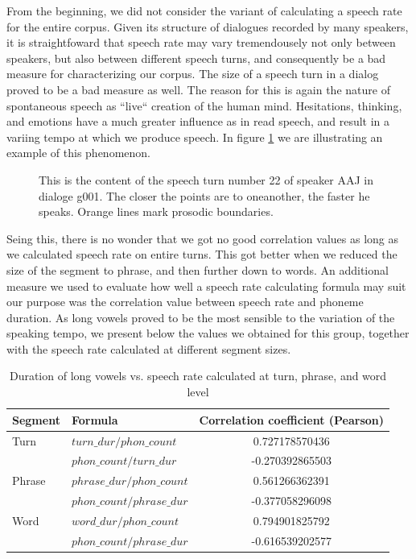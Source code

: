 \documentclass[a4paper]{scrreprt}
\begin{document}
From the beginning, we did not consider the variant of calculating a speech rate for the entire corpus. Given its structure of dialogues recorded by many speakers, it is straightfoward that speech rate may vary tremendousely not only between speakers, but also between different speech turns, and consequently be a bad measure for characterizing our corpus. The size of a speech turn in a dialog proved to be a bad measure as well. The reason for this is again the nature of spontaneous speech as ``live`` creation of the human mind. Hesitations, thinking, and emotions have a much greater influence as in read speech, and result in a variing tempo at which we produce speech. In figure \ref{fig:SR_example} we are illustrating an example of this phenomenon.

\begin{figure}[htbp]
	\centering
	\noindent{}
	\vspace{-25mm}
	\caption[Example of speech rate variation inside a turn]{This is the content of the speech turn number 22 of speaker AAJ in dialoge g001. The closer the points are to oneanother, the faster he speaks. Orange lines mark prosodic boundaries.}
	\label{fig:SR_example}
\end{figure}

Seing this, there is no wonder that we got no good correlation values as long as we calculated speech rate on entire turns. This got better when we reduced the size of the segment to phrase, and then further down to words. 
An additional measure we used to evaluate how well a speech rate calculating formula may suit our purpose was the correlation value between speech rate and phoneme duration. As long vowels proved to be the most sensible to the variation of the speaking tempo, we present below the values we obtained for this group, together with the speech rate calculated at different segment sizes.

\begin{table}[htbp]
\caption {Duration of long vowels vs. speech rate calculated at turn, phrase, and word level} 
\vspace{10mm}
\begin{tabular}{|l|l|c|}
\hline
Segment	 & Formula & Correlation coefficient (Pearson)\\
\hline
\hline
Turn 		& $turn\_dur / phon\_count$ &0.727178570436 \\
	\hline
	&  $phon\_count / turn\_dur$ & -0.270392865503 \\
	\hline
Phrase  & $phrase\_dur / phon\_count$ & 0.561266362391\\
	\hline
	&  $phon\_count / phrase\_dur$ & -0.377058296098\\
	\hline
Word  & $word\_dur / phon\_count$ &  0.794901825792\\
	\hline
	&  $phon\_count / phrase\_dur$ & -0.616539202577\\
	\hline
\end{tabular}
\end{table}
\end{document}
